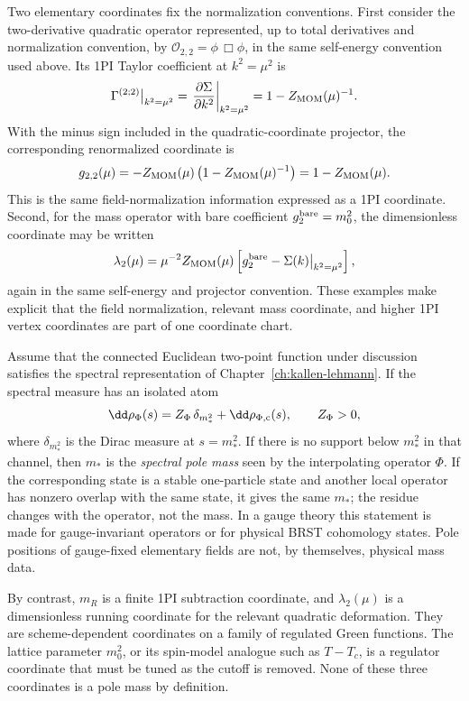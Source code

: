 Two elementary coordinates fix the normalization conventions.  First consider
the two-derivative quadratic operator represented, up to total derivatives and
normalization convention, by \(\mathcal O_{2,2}=\phi\,\Box\phi\), in the same
self-energy convention used above.  Its 1PI Taylor coefficient at
\(k^2=\mu^2\) is
\[
  \Gamma^{(2;2)}\big|_{k^2=\mu^2}
  =
  \left.
  \frac{\partial\Sigma}{\partial k^2}
  \right|_{k^2=\mu^2}
  =
  1-Z_{\rm MOM}(\mu)^{-1}.
\]
With the minus sign included in the quadratic-coordinate projector, the
corresponding renormalized coordinate is
\[
  g_{2,2}(\mu)
  =
  -Z_{\rm MOM}(\mu)\left(1-Z_{\rm MOM}(\mu)^{-1}\right)
  =
  1-Z_{\rm MOM}(\mu).
\]
This is the same field-normalization information expressed as a 1PI
coordinate.  Second, for the mass operator with bare coefficient
\(g_2^{\rm bare}=m_0^2\), the dimensionless coordinate may be written
\[
  \lambda_2(\mu)
  =
  \mu^{-2}Z_{\rm MOM}(\mu)
  \left[
    g_2^{\rm bare}
    -
    \Sigma(k)\big|_{k^2=\mu^2}
  \right],
\]
again in the same self-energy and projector convention.  These examples
make explicit that the field normalization, relevant mass coordinate, and
higher 1PI vertex coordinates are part of one coordinate chart.

\begin{definition}
\label{def:mass-data-and-mass-coordinates}
Assume that the connected Euclidean two-point function under discussion
satisfies the spectral representation of Chapter~\ref{ch:kallen-lehmann}.  If
the spectral measure has an isolated atom
\[
  \dd\rho_\Phi(s)
  =
  Z_\Phi\,\delta_{m_*^2}+\dd\rho_{\Phi,\rm c}(s),
  \qquad
  Z_\Phi>0,
\]
where \(\delta_{m_*^2}\) is the Dirac measure at \(s=m_*^2\).  If there is no
support below \(m_*^2\) in that channel, then \(m_*\) is the
\emph{spectral pole mass} seen by the interpolating operator \(\Phi\).  If the
corresponding state is a stable one-particle state and another local operator
has nonzero overlap with the same state, it gives the same \(m_*\); the residue
changes with the operator, not the mass.  In a gauge theory this statement is
made for gauge-invariant operators or for physical BRST cohomology states.
Pole positions of gauge-fixed elementary fields are not, by themselves,
physical mass data.

By contrast, \(m_R\) is a finite 1PI subtraction coordinate, and
\(\lambda_2(\mu)\) is a dimensionless running coordinate for the relevant
quadratic deformation.  They are scheme-dependent coordinates on a family of
regulated Green functions.  The lattice parameter \(m_0^2\), or its spin-model
analogue such as \(T-T_c\), is a regulator coordinate that must be tuned as the
cutoff is removed.  None of these three coordinates is a pole mass by
definition.
\end{definition}

